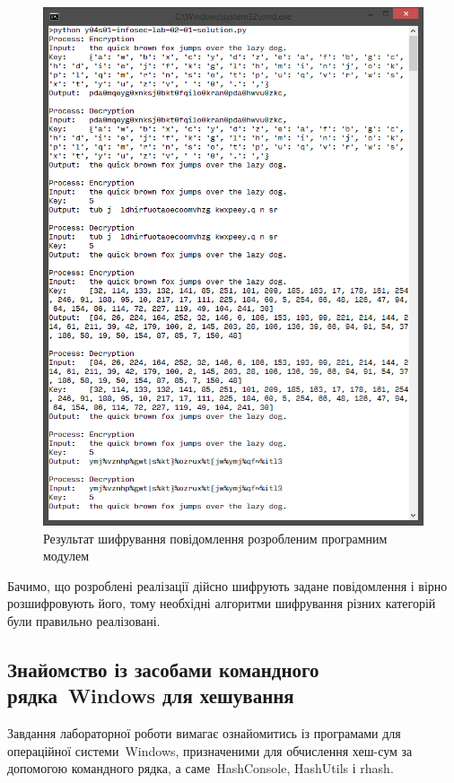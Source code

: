 \documentclass[
	a4paper,
	oneside,
	BCOR = 10mm,
	DIV = 12,
	12pt,
	headings = normal,
]{scrartcl}
\begin{document}
			\begin{figure}[!htbp]
				\centering
				\includegraphics[height = 16\baselineskip]{./assets/00.png}
				\caption{Результат шифрування повідомлення розробленим програмним модулем}
				\label{fig:script-encryption-res}
			\end{figure}

			Бачимо, що розроблені реалізації дійсно шифрують задане повідомлення і вірно розшифровують його, тому необхідні алгоритми шифрування різних категорій були правильно реалізовані.

		\subsection{Знайомство із засобами командного рядка~\textenglish{Windows} для хешування}
			Завдання лабораторної роботи вимагає ознайомитись із програмами для операційної системи~\textenglish{Windows}, призначеними для обчислення хеш-сум за допомогою командного рядка, а саме~\textenglish{HashConsole}, \textenglish{HashUtils} і \textenglish{rhash}.
\end{document}
